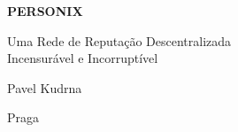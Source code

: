 \thispagestyle{empty}
\begin{center}
  {\sffamily\bfseries\fontsize{34}{40}\selectfont PERSONIX\par}
  \vspace{2.2em}
  {\rmfamily\large Uma Rede de Reputação Descentralizada\\[0.25em]
   Incensurável e Incorruptível\par}
\end{center}
\begin{center}
  {\rmfamily\Large Pavel Kudrna\par}
  \vspace{0.45em}
  {\rmfamily\small Praga\quad\textbullet{}\par}
\end{center}
\clearpage
